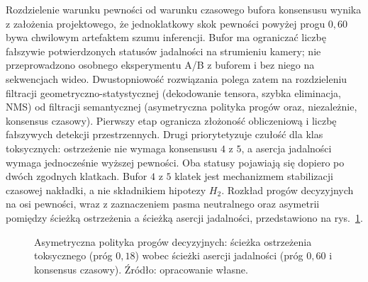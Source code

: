 Rozdzielenie warunku pewności od warunku czasowego bufora konsensusu wynika z założenia projektowego, że jednoklatkowy skok pewności powyżej progu $0{,}60$ bywa chwilowym artefaktem szumu inferencji. Bufor ma ograniczać liczbę fałszywie potwierdzonych statusów jadalności na strumieniu kamery; nie przeprowadzono osobnego eksperymentu A/B z buforem i bez niego na sekwencjach wideo. Dwustopniowość rozwiązania polega zatem na rozdzieleniu filtracji geometryczno-statystycznej (dekodowanie tensora, szybka eliminacja, NMS) od filtracji semantycznej (asymetryczna polityka progów oraz, niezależnie, konsensus czasowy). Pierwszy etap ogranicza złożoność obliczeniową i liczbę fałszywych detekcji przestrzennych. Drugi priorytetyzuje czułość dla klas toksycznych: ostrzeżenie nie wymaga konsensusu $4$ z $5$, a asercja jadalności wymaga jednocześnie wyższej pewności. Oba statusy pojawiają się dopiero po dwóch zgodnych klatkach. Bufor $4$ z $5$ klatek jest mechanizmem stabilizacji czasowej nakładki, a nie składnikiem hipotezy $H_2$. Rozkład progów decyzyjnych na osi pewności, wraz z zaznaczeniem pasma neutralnego oraz asymetrii pomiędzy ścieżką ostrzeżenia a ścieżką asercji jadalności, przedstawiono na rys.~\ref{fig:progi_asymetryczne}.

\begin{figure}[htbp]
 \centering
 \caption{Asymetryczna polityka progów decyzyjnych: ścieżka ostrzeżenia toksycznego (próg $0{,}18$) wobec ścieżki asercji jadalności (próg $0{,}60$ i konsensus czasowy). Źródło: opracowanie własne.}
 \label{fig:progi_asymetryczne}
\end{figure}

